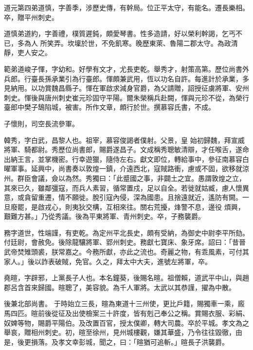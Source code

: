 \begin{pinyinscope}
 道元第四弟道慎，字善季，涉歷史傳，有幹局。位正平太守，有能名。遷長樂相。卒，贈平州刺史。



 道慎弟道約，字善禮，樸質遲鈍，頗愛琴書。性多造請，好以榮利幹謁，乞丐不已，多為人
 所笑弄。坎壈於世，不免飢寒。晚歷東萊、魯陽二郡太守。為政清靜，吏人安之。



 範弟道峻子惲，字幼和。好學有文才，尤長吏乾。舉秀才，射策高第。歷位尚書外兵郎。行臺長孫承業引為行臺郎。惲頗兼武用，恆以功名自許。每進計於承業，多見納用。以功賞魏昌縣子。惲在軍啟求減身官爵，為父請贈，詔授征虜將軍、安州刺史。惲後與唐州刺史崔元珍固守平陽。爾朱榮稱兵赴闕，惲與元珍不從，為榮行臺郎中樊子鵠陷城，被害。所作文章，頗行於世。撰慕容氏書，不成。



 子懷則，司空長流參軍。



 韓秀，字白武，昌黎人也。祖宰，慕容俊謁者僕射。父景，皇
 始初歸魏，拜宣威將軍、騎都尉。秀歷位尚書郎，賜爵遂昌子。文成稱秀聰敏清辯，才任喉舌，遂命出納王言，並掌機密。行幸遊獵，隨侍左右。獻文即位，轉給事中，參征南慕容白曜軍事。延興中，尚書奏以敦煌一鎮，介遠西北，寇賊路衝，慮或不固，欲移就涼州。群臣會議，僉以為然。秀獨曰：「此蹙國之事，非闢土之宜。愚謂敦煌之立，其來已久，雖鄰彊寇，而兵人素習，循常置戍，足以自全。若徙就姑臧，慮人懷異意，或貪留重遷，情不願徙。脫引寇內侵，深為國患。且捨遠就近，遙防有闕。一旦廢罷，是啟戎心，則夷狄交構，互相來往。關右荒擾，烽警不息，邊役
 煩興，艱難方甚。」乃從秀議。後為平東將軍、青州刺史。卒，子務襲爵。



 務字道世，性端謹，有吏乾。為定州平北長史，頗有受納，為御史中尉李平所劾。付廷尉，會赦免。後除龍驤將軍、郢州刺史。務獻七寶床、象牙席。詔曰：「昔晉武帝焚雉頭裘，朕常嘉之。今務所獻，亦此之流也。奇麗之物，有乖風素，可付其家人。」後以詐表破賊，免官。久之，拜太中大夫，進號左將軍，卒。



 堯暄，字辟邪，上黨長子人也。本名鐘葵，後賜名暄。祖僧賴，道武平中山，與趙郡呂含首來歸國。暄聰了，美容貌。為千人軍將。太武以其恭謹，擢為中散。



 後兼北部尚書。
 于時始立三長，暄為東道十三州使，更比戶籍，賜獨車一乘，廄馬四匹。暄前後從征及出使檢案三十許度，皆有剋己奉公之稱。賞賜衣服、彩絹、奴婢等物，賜爵平陽伯。及改置百官，授太僕卿，轉大司農。卒於平城。孝文為之舉哀，贈相州刺史。初，暄至徐州，見州城樓觀，嫌其華盛，乃令往往毀徹，由是，後更損落。及孝文幸彭城，聞之，曰：「暄猶可追斬。」暄長子洪襲爵。




\end{pinyinscope}

